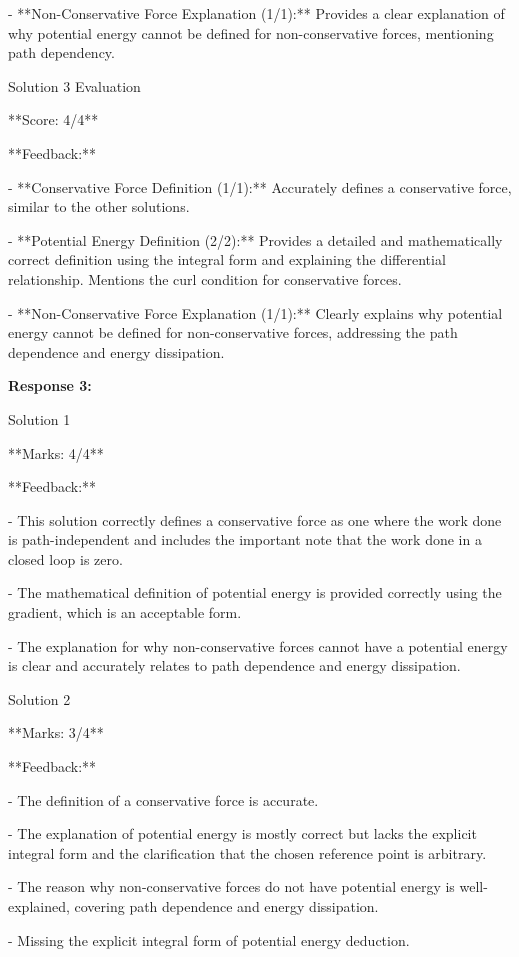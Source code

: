 \documentclass[a4paper,11pt]{article}
\begin{document}
- **Non-Conservative Force Explanation (1/1):** Provides a clear explanation of why potential energy cannot be defined for non-conservative forces, mentioning path dependency.

Solution 3 Evaluation

**Score: 4/4**

**Feedback:**

- **Conservative Force Definition (1/1):** Accurately defines a conservative force, similar to the other solutions.

- **Potential Energy Definition (2/2):** Provides a detailed and mathematically correct definition using the integral form and explaining the differential relationship. Mentions the curl condition for conservative forces.

- **Non-Conservative Force Explanation (1/1):** Clearly explains why potential energy cannot be defined for non-conservative forces, addressing the path dependence and energy dissipation.

\bigskip
\textbf{Response 3:}

Solution 1

**Marks: 4/4**

**Feedback:**

- This solution correctly defines a conservative force as one where the work done is path-independent and includes the important note that the work done in a closed loop is zero.

- The mathematical definition of potential energy is provided correctly using the gradient, which is an acceptable form.

- The explanation for why non-conservative forces cannot have a potential energy is clear and accurately relates to path dependence and energy dissipation.

Solution 2

**Marks: 3/4**

**Feedback:**

- The definition of a conservative force is accurate.

- The explanation of potential energy is mostly correct but lacks the explicit integral form and the clarification that the chosen reference point is arbitrary.

- The reason why non-conservative forces do not have potential energy is well-explained, covering path dependence and energy dissipation.

- Missing the explicit integral form of potential energy deduction.
\end{document}
